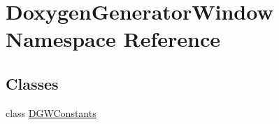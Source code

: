 \hypertarget{namespace_doxygen_generator_window}{}\section{Doxygen\+Generator\+Window Namespace Reference}
\label{namespace_doxygen_generator_window}
\subsection*{Classes}
\begin{DoxyCompactItemize}
\item 
class \hyperlink{class_doxygen_generator_window_1_1_d_g_w_constants}{D\+G\+W\+Constants}
\end{DoxyCompactItemize}
